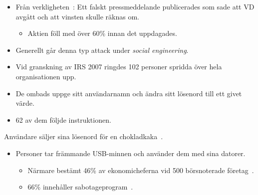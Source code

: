 \begin{frame}
  \begin{example}
    \begin{itemize}
      \item Från verkligheten~\cite{Anderson2008sea}: Ett falskt pressmeddelande 
        publicerades som sade att VD avgått och att vinsten skulle räknas om.
        \begin{itemize}
          \item Aktien föll med över \unit{60}{\%} innan det uppdagades.
        \end{itemize}

      \item Generellt går denna typ attack under \emph{social engineering}.

    \end{itemize}
  \end{example}
\end{frame}

\begin{frame}
  \begin{example}
    \begin{itemize}
      \item Vid granskning av IRS 2007 ringdes 102 personer spridda över hela 
        organisationen upp.

      \item De ombads uppge sitt användarnamn och ändra sitt lösenord till ett 
        givet värde.

      \item 62 av dem följde instruktionen.

    \end{itemize}
  \end{example}
\end{frame}

\begin{frame}
  \begin{example}
    Användare säljer sina lösenord för en chokladkaka~\cite{dn2010choklad}.
  \end{example}

  \begin{example}
    \begin{itemize}
      \item Personer tar främmande USB-minnen och använder dem med sina datorer.
        \begin{itemize}
          \item Närmare bestämt \unit{46}{\%} av ekonomicheferna vid 500 
            börsnoterade företag~\cite{pickupusb}.
          \item \unit{66}{\%} innehåller sabotageprogram~\cite{Sophos2011usbmal}.
        \end{itemize}

    \end{itemize}
  \end{example}
\end{frame}

